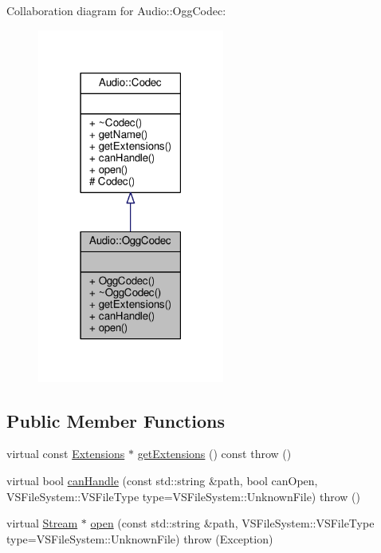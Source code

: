 Collaboration diagram for Audio\+:\+:Ogg\+Codec\+:
\nopagebreak
\begin{figure}[H]
\begin{center}
\leavevmode
\includegraphics[width=174pt]{db/d93/classAudio_1_1OggCodec__coll__graph}
\end{center}
\end{figure}
\subsection*{Public Member Functions}
\begin{DoxyCompactItemize}
\item 
virtual const \hyperlink{classAudio_1_1Codec_a2f2e8eb4d85b0e5b338764adfa4bc881}{Extensions} $\ast$ \hyperlink{classAudio_1_1OggCodec_acc8ecbc48b092d851b2e9280234f1cdd}{get\+Extensions} () const   throw ()
\item 
virtual bool \hyperlink{classAudio_1_1OggCodec_af8071151d8920b49f7ca5ed1c826ee80}{can\+Handle} (const std\+::string \&path, bool can\+Open, V\+S\+File\+System\+::\+V\+S\+File\+Type type=V\+S\+File\+System\+::\+Unknown\+File)  throw ()
\item 
virtual \hyperlink{classAudio_1_1Stream}{Stream} $\ast$ \hyperlink{classAudio_1_1OggCodec_a23ea17b563b23f37bd607932ccb9a06d}{open} (const std\+::string \&path, V\+S\+File\+System\+::\+V\+S\+File\+Type type=V\+S\+File\+System\+::\+Unknown\+File)  throw (\+Exception)
\end{DoxyCompactItemize}
